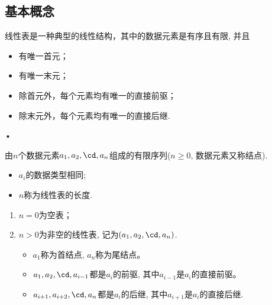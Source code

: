 \subsection{基本概念}

\begin{frame}\ft{\subsecname}


线性表是一种典型的线性结构，其中的数据元素是{有序且有限}, 并且
\begin{itemize}
\item
有唯一首元；
\item
有唯一末元；
\item
除首元外，每个元素均有唯一的直接前驱；
\item
除末元外，每个元素均有唯一的直接后继. 
\end{itemize}•

\end{frame}

\begin{frame}\ft{\subsecname} 
\begin{dingyi}[线性表]
由$n$个数据元素$a_1,a_2,\cd,a_n$组成的有限序列($n\ge 0$, 数据元素又称结点).
\begin{itemize}
\item $a_i$的数据类型相同;
\item $n$称为线性表的长度.
\end{itemize}
\end{dingyi}

\end{frame}

\begin{frame}\ft{\subsecname} 
 
\begin{enumerate}
\item $n=0$为空表；\\[0.1in]
\item $n>0$为非空的线性表, 记为$(a_1,a_2,\cd,a_n)$. 
\begin{itemize}
\item
$a_1$称为首结点, $a_n$称为尾结点。 
\item 
$a_1,a_2,\cd,a_{i-1}$都是$a_i%
$的前驱, 其中$a_{i-1}$是$a_i$的直接前驱。
\item 
$a_{i+1},a_{i+2},\cd,a_{n}$都是$a_i%
$的后继, 其中$a_{i+1}$是$a_i$的直接后继. 
\end{itemize}
\end{enumerate}
\end{frame}


